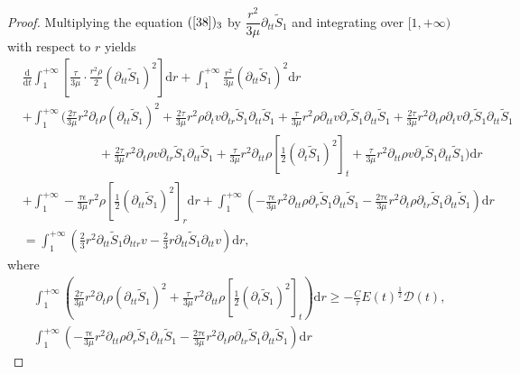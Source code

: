 \documentclass[10pt,reqno]{amsart}
\numberwithin{equation}{section}
\begin{document}
\begin{proof}
		Multiplying the equation $(\ref{38})_3$ 
		by  $\dfrac{r^2}{3\mu}\partial_{tt} \tilde{S}_1$ and integrating over $[1,+\infty)$ with respect to $r$ yields
		\begin{equation}\label{42}
			\begin{aligned}
				&\frac{\mathrm{d}}{\mathrm{d} t}\int_{1}^{+\infty}\left[\frac{\tau}{3 \mu} \cdot \frac{r^2 \rho}{2}(\partial_{tt} \tilde{S}_1)^2\right]\mathrm{d}r
				+\int_{1}^{+\infty}\frac{r^2}{3 \mu}(\partial_{tt}\tilde{S}_1)^2\mathrm{d}r\\
				&+\int_{1}^{+\infty}\bigg(\frac{2\tau}{3 \mu}r^2\partial_{t}\rho(\partial_{tt} \tilde{S}_1)^2+\frac{2\tau}{3 \mu}r^2\rho\partial_{t}v\partial_{tr} \tilde{S}_1\partial_{tt} \tilde{S}_1+\frac{\tau}{3 \mu}r^2\rho\partial_{tt}v\partial_{r} \tilde{S}_1\partial_{tt} \tilde{S}_1
				+\frac{2\tau}{3 \mu}r^2\partial_{t}\rho\partial_{t}v\partial_{r} \tilde{S}_1\partial_{tt} \tilde{S}_1\\
				&\qquad\qquad\qquad
				+\frac{2\tau}{3 \mu}r^2\partial_{t}\rho v \partial_{tr} \tilde{S}_1\partial_{tt} \tilde{S}_1
				+\frac{\tau}{3 \mu}r^2\partial_{tt}\rho[\frac{1}{2}(\partial_{t} \tilde{S}_1)^2]_t
				+\frac{\tau}{3 \mu}r^2\partial_{tt}\rho v\partial_{r} \tilde{S}_1\partial_{tt} \tilde{S}_1\bigg)\mathrm{d}r\\
				&+\int_{1}^{+\infty}
				-\frac{\tau\epsilon}{3 \mu}r^2\rho[\frac{1}{2}(\partial_{tt}\tilde{S}_1)^2]_r\mathrm{d}r
				+\int_{1}^{+\infty}\left(-\frac{\tau\epsilon}{3 \mu}r^2\partial_{tt}\rho \partial_{r}\tilde{S}_1\partial_{tt} \tilde{S}_1
				-\frac{2\tau\epsilon}{3 \mu}r^2 \partial_{t}\rho \partial_{tr}\tilde{S}_1\partial_{tt}\tilde{S}_1\right)\mathrm{d}r\\
				&=\int_{1}^{+\infty}\left(\frac{2}{3}r^2\partial_{tt} \tilde{S}_1\partial_{ttr}v
				-\frac{2}{3}r\partial_{tt} \tilde{S}_1\partial_{tt}v\right) \mathrm{d}r
				,
			\end{aligned}
		\end{equation}
		where
		\begin{equation}\nonumber
			\begin{aligned}
				&\int_{1}^{+\infty}\left(\frac{2\tau}{3 \mu}r^2\partial_{t}\rho(\partial_{tt} \tilde{S}_1)^2
				+\frac{\tau}{3 \mu}r^2\partial_{tt}\rho [\frac{1}{2}(\partial_{t} \tilde{S}_1)^2]_t\right)\mathrm{d}r
				\geq-\frac{C}{\tau}E(t)^{\frac{1}{2}} \mathcal{D}(t),\\
				&\int_{1}^{+\infty}\left(-\frac{\tau\epsilon}{3 \mu}r^2\partial_{tt}\rho \partial_{r}\tilde{S}_1\partial_{tt} \tilde{S}_1
				-\frac{2\tau\epsilon}{3 \mu}r^2 \partial_{t}\rho \partial_{tr}\tilde{S}_1\partial_{tt}\tilde{S}_1\right)\mathrm{d}r

\end{aligned}
\end{equation}
\end{proof}
\end{document}
